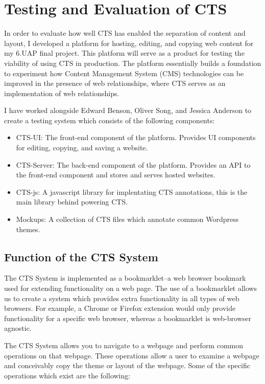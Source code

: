 \documentclass[12pt]{article}
\begin{document}
\section{Testing and Evaluation of CTS}

In order to evaluate how well CTS has enabled the separation of content and layout, I developed a platform for hosting, editing, and copying web content for my 6.UAP final project. This platform will serve as a product for testing the viability of using CTS in production. The platform essentially builds a foundation to experiment how Content Management System (CMS) technologies can be improved in the presence of web relationships, where CTS serves as an implementation of web relationships.

I have worked alongside Edward Benson, Oliver Song, and Jessica Anderson to create a testing system which consists of the following components:
\begin{itemize}
  \item CTS-UI: The front-end component of the platform. Provides UI components for editing, copying, and saving a website.
  \item CTS-Server: The back-end component of the platform. Provides an API to the front-end component and stores and serves hosted websites.
  \item CTS-js: A javascript library for implentating CTS annotations, this is the main library behind powering CTS.
  \item Mockups: A collection of CTS files which annotate common Wordpress themes.
\end{itemize}

\subsection{Function of the CTS System}

The CTS System is implemented as a bookmarklet--a web browser bookmark used for extending functionality on a web page. The use of a bookmarklet allows us to create a system which provides extra functionality in all types of web browsers. For example, a Chrome or Firefox extension would only provide functionality for a specific web browser, whereas a bookmarklet is web-browser agnostic.

The CTS System allows you to navigate to a webpage and perform common operations on that webpage. These operations allow a user to examine a webpage and conceivably copy the theme or layout of the webpage. Some of the specific operations which exist are the following:
\end{document}
